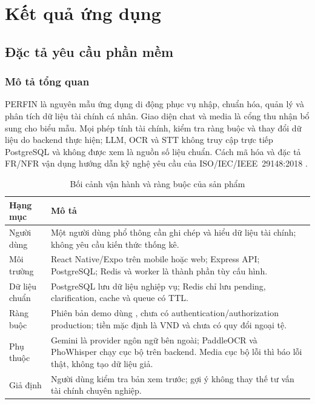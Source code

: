 \chapter{Kết quả ứng dụng}
\label{chap:results}

\section{Đặc tả yêu cầu phần mềm}

\subsection{Mô tả tổng quan}

PERFIN là nguyên mẫu ứng dụng di động phục vụ nhập, chuẩn hóa, quản lý và phân tích dữ liệu tài chính cá nhân. Giao diện chat và media là cổng thu nhận bổ sung cho biểu mẫu. Mọi phép tính tài chính, kiểm tra ràng buộc và thay đổi dữ liệu do backend thực hiện; LLM, OCR và STT không truy cập trực tiếp PostgreSQL và không được xem là nguồn số liệu chuẩn. Cách mã hóa và đặc tả FR/NFR vận dụng hướng dẫn kỹ nghệ yêu cầu của ISO/IEC/IEEE~29148:2018 \cite{iso29148}.

\begin{table}[H]
  \centering
  \caption{Bối cảnh vận hành và ràng buộc của sản phẩm}
  \label{tab:product-overview}
  \begin{tabularx}{\textwidth}{@{}L{3.5cm}Y@{}}
    \toprule
    \textbf{Hạng mục} & \textbf{Mô tả} \\
    \midrule
    Người dùng & Một người dùng phổ thông cần ghi chép và hiểu dữ liệu tài chính; không yêu cầu kiến thức thống kê. \\
    Môi trường & React Native/Expo trên mobile hoặc web; Express API; PostgreSQL; Redis và worker là thành phần tùy cấu hình. \\
    Dữ liệu chuẩn & PostgreSQL lưu dữ liệu nghiệp vụ; Redis chỉ lưu pending, clarification, cache và queue có TTL. \\
    Ràng buộc & Phiên bản demo dùng , chưa có authentication/authorization production; tiền mặc định là VND và chưa có quy đổi ngoại tệ. \\
    Phụ thuộc & Gemini là provider ngôn ngữ bên ngoài; PaddleOCR và PhoWhisper chạy cục bộ trên backend. Media cục bộ lỗi thì báo lỗi thật, không tạo dữ liệu giả. \\
    Giả định & Người dùng kiểm tra bản xem trước; gợi ý không thay thế tư vấn tài chính chuyên nghiệp. \\
    \bottomrule
  \end{tabularx}
\end{table}

